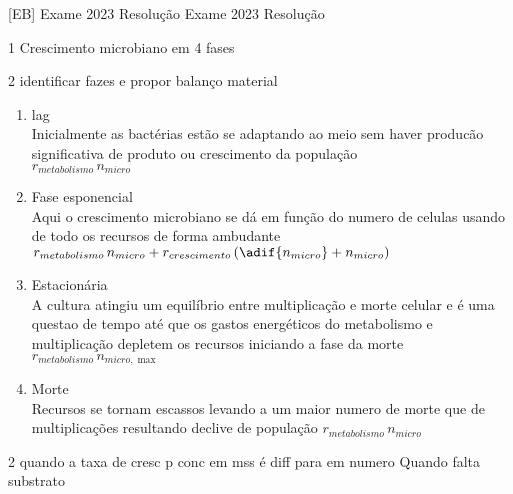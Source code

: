 \documentclass[\mainfilename]{subfiles}
\begin{document}

[EB]
{Exame 2023 Resolução} %
{Exame 2023 Resolução} %

\begin{questionBox}1{ %
    Crescimento microbiano em 4 fases
} %
    \begin{questionBox}2{ %
        identificar fazes e propor balanço material
    } %
        \answer{}
        \begin{enumerate}[label=(\roman{enumi})]
            \item lag\\
            Inicialmente as bactérias estão se adaptando ao meio sem haver producão significativa de produto ou crescimento da população\\
            \(r_{metabolismo}\,n_{micro}\)
            \item Fase esponencial\\
            Aqui o crescimento microbiano se dá em função do numero de celulas usando de todo os recursos de forma ambudante\\
            \(
                r_{metabolismo}\,n_{micro}
                + r_{crescimento}\,(
                    \adif{n_{micro}}+n_{micro}
                )
            \)
            \item Estacionária\\
            A cultura atingiu um equilíbrio entre multiplicação e morte celular e é uma questao de tempo até que os gastos energéticos do metabolismo e multiplicação depletem os recursos iniciando a fase da morte
            \(
                r_{metabolismo}\,n_{micro,\max}
            \)
            \item Morte\\
            Recursos se tornam escassos levando a um maior numero de morte que de multiplicações resultando declive de população
            \(
                r_{metabolismo}\,n_{micro}
            \)
        \end{enumerate}
    \end{questionBox}
    \begin{questionBox}2{ %
        quando a taxa de cresc p conc em mss é diff para em numero
    } %
        \answer{}
        Quando falta substrato
    \end{questionBox}
\end{questionBox}
\end{document}
